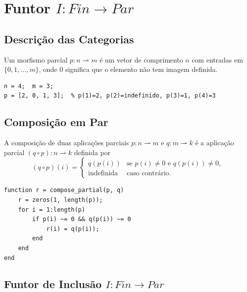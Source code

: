 \section{Funtor $I: Fin \to Par$}
\label{sec:functor-fin-par}

\subsection{Descrição das Categorias}

\begin{definition}
Um morfismo parcial $p: n \rightharpoonup m$ é um vetor de comprimento $n$ com entradas em $\{0, 1,\ldots,m\}$, onde $0$ significa que o elemento não tem imagem definida.
\end{definition}

\begin{lstlisting}[style=matlab, caption={Morfismo parcial em $\mathbf{Par}$}]
n = 4;  m = 3;
p = [2, 0, 1, 3];  % p(1)=2, p(2)=indefinido, p(3)=1, p(4)=3
\end{lstlisting}

\subsection{Composição em Par}

A composição de duas aplicações parciais $p: n \rightharpoonup m$ e $q: m \rightharpoonup k$ é a aplicação parcial $(q \circ p): n \rightharpoonup k$ definida por
\[
    (q \circ p)(i) =
    \begin{cases}
        q(p(i)) & \text{se } p(i) \neq 0 \text{ e } q(p(i)) \neq 0,\\
        \text{indefinida} & \text{caso contrário.}
    \end{cases}
\]

\begin{lstlisting}[style=matlab, caption={Composição de aplicações parciais}]
function r = compose_partial(p, q)
    r = zeros(1, length(p));
    for i = 1:length(p)
        if p(i) ~= 0 && q(p(i)) ~= 0
            r(i) = q(p(i));
        end
    end
end
\end{lstlisting}

\subsection{Funtor de Inclusão $I: Fin \to Par$}

